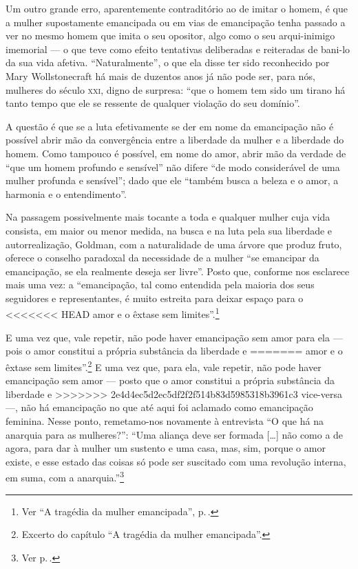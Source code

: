 Um outro grande erro, aparentemente contraditório ao de imitar o homem,
é que a mulher supostamente emancipada ou em vias de
emancipação tenha passado a ver no mesmo homem que imita o seu opositor,
algo como o seu arqui-inimigo imemorial --- o que teve como efeito
tentativas deliberadas e reiteradas de bani-lo da sua vida afetiva.
``Naturalmente'', o que ela disse ter sido reconhecido por Mary
Wollstonecraft há mais de duzentos anos já não pode ser, para nós, mulheres
do século \textsc{xxi}, digno de surpresa: ``que o homem tem sido um tirano há
tanto tempo que ele se ressente de qualquer violação do seu domínio''.

A
questão é que se a luta efetivamente se der em nome da
emancipação não é possível abrir mão da convergência entre a
liberdade da mulher e a liberdade do homem. Como tampouco é possível, em
nome do amor, abrir mão da verdade de ``que um homem profundo e
sensível'' não difere ``de modo considerável de uma mulher profunda e
sensível''; dado que ele ``também busca a beleza e o amor, a harmonia e
o entendimento''.

Na passagem possivelmente mais tocante a toda e
qualquer mulher cuja vida consista, em maior ou menor medida, na busca e
na luta pela sua liberdade e autorrealização, Goldman, com a
naturalidade de uma árvore que produz fruto, oferece o conselho
paradoxal da necessidade de a mulher ``se emancipar da emancipação, se
ela realmente deseja ser livre''. Posto que, conforme nos esclarece mais
uma vez: a ``emancipação, tal como entendida pela maioria dos seus
seguidores e representantes, é muito estreita para deixar espaço para o
<<<<<<< HEAD
amor e o êxtase sem limites''.\footnote{Ver ``A tragédia da mulher emancipada'', p.\,\pageref{extase}.}

E uma vez que, vale repetir, não pode haver emancipação sem amor para ela
--- pois o amor constitui a própria substância da liberdade e
=======
amor e o êxtase sem limites''.\footnote{Excerto do capítulo ``A tragédia da mulher emancipada''.} E
uma vez que, para ela, vale repetir, não pode haver emancipação sem amor
--- posto que o amor constitui a própria substância da liberdade e
>>>>>>> 2e4d4ec5d2ec5df2f2f514b83d5985318b3961c3
vice-versa ---, não há emancipação no que até aqui foi aclamado como
emancipação feminina. Nesse ponto, remetamo-nos novamente à entrevista
``O que há na anarquia para as mulheres?'': ``Uma aliança
deve ser formada {[}\ldots{]} não como a de agora, para dar à mulher um
sustento e uma casa, mas, sim, porque o amor existe, e esse estado das
coisas só pode ser suscitado com uma revolução interna, em suma, com a
anarquia.''\footnote{Ver p.\,\pageref{alianca}.}

